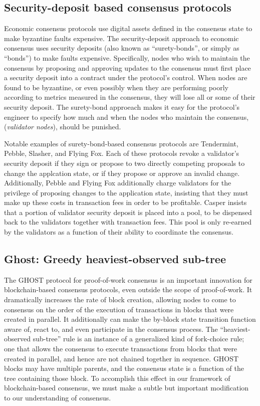 \documentclass[11pt,a4paper]{article}
\begin{document}
\subsection{Security-deposit based consensus protocols}

Economic consensus protocols use digital assets defined in the consensus state to make byzantine faults expensive. The security-deposit approach to economic consensus uses security deposits (also known as ``surety-bonds'', or simply as ``bonds'') to make faults expensive. Specifically, nodes who wish to maintain the consensus by proposing and approving updates to the consensus must first place a security deposit into a contract under the protocol's control. When nodes are found to be byzantine, or even possibly when they are performing poorly according to metrics measured in the consensus, they will lose all or some of their security deposit. The surety-bond approeach makes it easy for the protocol's engineer to specify how much and when the nodes who maintain the consensus, (\emph{validator nodes}), should be punished.

Notable examples of surety-bond-based consensus protocols are Tendermint\cite{TM}, Pebble\cite{Pebble}, Slasher\cite{Slasher}, and Flying Fox\cite{FlyingFox}. Each of these protocols revoke a validator's security deposit if they sign or propose to two directly competing proposals to change the applcation state, or if they propose or approve an invalid change. Additionally, Pebble and Flying Fox additionally charge validators for the privilege of proposing changes to the application state, insisting that they must make up these costs in transaction fees in order to be profitable. Casper insists that a portion of validator security deposit is placed into a pool, to be dispensed back to the validators together with transaction fees. This pool is only re-earned by the validators as a function of their ability to coordinate the consensus. 

\subsection{Ghost: Greedy heaviest-observed sub-tree}

The GHOST protocol for proof-of-work consensus\cite{GHOST} is an important innovation for blockchain-based consensus protocols, even outside the scope of proof-of-work. It dramatically increases the rate of block creation, allowing nodes to come to consensus on the order of the execution of transactions in blocks that were created in parallel. It additionally can make the by-block state transition function aware of, react to, and even participate in the consensus process. The ``heaviest-observed sub-tree'' rule is an instance of a generalized kind of fork-choice rule; one that allows the consensus to execute transactions from blocks that were created in parallel, and hence are not chained together in sequence. GHOST blocks may have multiple parents, and the consensus state is a function of the tree containing those block. To accomplish this effect in our framework of blockchain-based consensus, we must make a subtle but important modification to our understanding of consensus.
\end{document}
